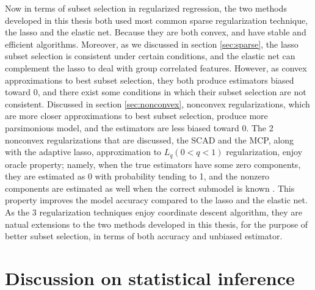 Now in terms of subset selection in regularized regression, the two methods developed in this thesis both used most common sparse regularization technique, the lasso and the elastic net. Because they are both convex, and have stable and efficient algorithms. Moreover, as we discussed in section \ref{sec:sparse}, the lasso subset selection is consistent under certain conditions, and the elastic net can complement the lasso to deal with group correlated features. However, as convex approximations to best subset selection, they both produce estimators biased toward 0, and there exist some conditions in which their subset selection are not consistent. Discussed in section \ref{sec:nonconvex}, nonconvex regularizations, which are more closer approximations to best subset selection, produce more parsimonious model, and the estimators are less biased toward 0. The 2 nonconvex regularizations that are discussed, the SCAD and the MCP, along with the adaptive lasso, approximation to $L_q (0<q<1)$ regularization, enjoy oracle property; namely, when the true estimators have some zero components, they are estimated as 0 with probability tending to 1, and the nonzero components are estimated as well when the correct submodel is known \citep{fan2001variable}. This property improves the model accuracy compared to the lasso and the elastic net. As the 3 regularization techniques enjoy coordinate descent algorithm, they are natual extensions to the two methods developed in this thesis, for the purpose of better subset selection, in terms of both accuracy and unbiased estimator. 

\section{Discussion on statistical inference}
